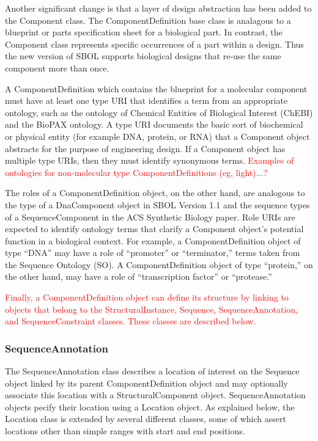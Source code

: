 \documentclass[draftspec]{sbmlpkgspec}
\begin{document}
Another significant change is that a layer of design abstraction has been added to the Component class.  The ComponentDefinition base class is analagous to a blueprint or parts specification sheet for a biological part.  In contrast, the Component class represents specific occurrences of a part within a design.  Thus the new version of SBOL supports biological designs that re-use the same component more than once. 

A ComponentDefinition which contains the blueprint for a molecular component must have at least one type URI that identifies a term from an appropriate ontology, such as the ontology of Chemical Entities of Biological Interest (ChEBI) and the BioPAX ontology. A type URI documents the basic sort of biochemical or physical entity (for example DNA, protein, or RNA) that a Component object abstracts for the purpose of engineering design. If a Component object has multiple type URIs, then they must identify synonymous terms.
\textcolor{red}{Examples of ontologies for non-molecular type ComponentDefinitions (eg, light)...?}

The roles of a ComponentDefinition object, on the other hand, are analogous to the type of a DnaComponent object in SBOL Version 1.1 and the sequence types of a SequenceComponent in the ACS Synthetic Biology paper. Role URIs are expected to identify ontology terms that clarify a Component object’s potential function in a biological context. For example, a ComponentDefinition object of type “DNA” may have a role of “promoter” or “terminator,” terms taken from the Sequence Ontology (SO). A ComponentDefinition object of type “protein,” on the other hand, may have a role of “transcription factor” or “protease.” 

\textcolor{red}{Finally, a ComponentDefinition object can define its structure by linking to objects that belong to the StructuralInstance, Sequence, SequenceAnnotation, and SequenceConstraint classes. These classes are described below.}

\subsubsection{SequenceAnnotation}
\label{sec:SequenceAnnotation}
The SequenceAnnotation class describes a location of interest on the Sequence object linked by its parent ComponentDefinition object and may optionally associate this location with a StructuralComponent object. SequenceAnnotation objects pecify their location using a Location object. As explained below, the Location class is extended by several different classes, some of which assert locations other than simple ranges with start and end positions.
\end{document}
